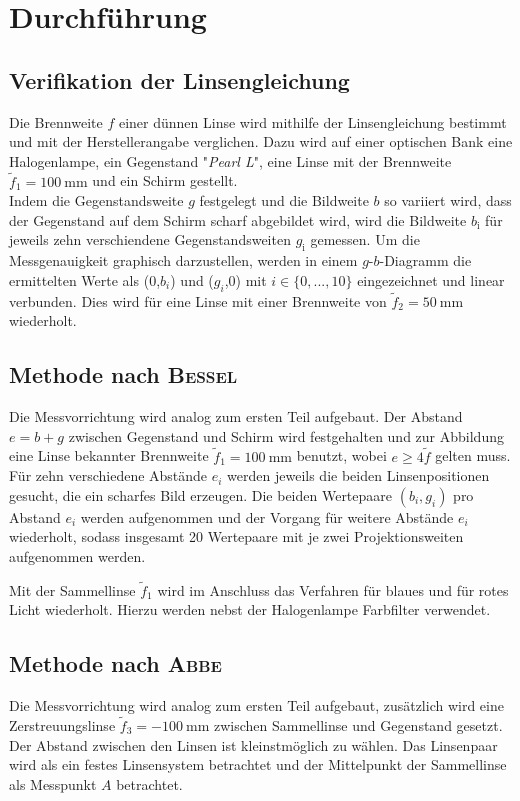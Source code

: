 \section{Durchführung}
\label{sec:Durchfuehrung}
\subsection{Verifikation der Linsengleichung}
\label{sec:Durchfuehrung1}
Die Brennweite $f$ einer dünnen Linse wird mithilfe der Linsengleichung bestimmt und mit der Herstellerangabe verglichen.
Dazu wird auf einer optischen Bank eine Halogenlampe, ein Gegenstand "\emph{Pearl L}",  eine Linse mit der Brennweite $\tilde{f}_1=\SI{100}{\milli\meter}$ und ein Schirm gestellt. \\
Indem die Gegenstandsweite $g$ festgelegt und die Bildweite $b$ so variiert wird, dass der Gegenstand auf dem Schirm scharf abgebildet wird, wird die Bildweite $b_\text{i}$ für jeweils zehn verschiendene Gegenstandsweiten $g_\text{i}$ gemessen.
Um die Messgenauigkeit graphisch darzustellen, werden in einem $g$-$b$-Diagramm die ermittelten Werte als ($0$,$b_i$) und ($g_i$,$0$) mit $i\in \{0,...,10\}$ eingezeichnet und linear verbunden.
Dies wird für eine Linse mit einer Brennweite von $\tilde{f}_2=\SI{50}{\milli\meter}$ wiederholt.


\subsection{Methode nach \texorpdfstring{\textsc{Bessel}}{Bessel}}
\label{sec:Durchfuehrung2}
Die Messvorrichtung wird analog zum ersten Teil aufgebaut.
Der Abstand \\$e=b+g$ zwischen Gegenstand und Schirm wird festgehalten und zur Abbildung eine Linse bekannter Brennweite $\tilde{f}_1=\SI{100}{\milli\meter}$ benutzt, wobei $e\ge4\tilde{f}$ gelten muss.
Für zehn verschiedene Abstände $e_i$ werden jeweils die beiden Linsenpositionen gesucht, die ein scharfes Bild erzeugen. 
Die beiden Wertepaare $(b_i,g_i)$ pro Abstand $e_i$ werden aufgenommen und der Vorgang für weitere Abstände $e_i$ wiederholt, sodass insgesamt 20 Wertepaare mit je zwei Projektionsweiten aufgenommen werden.

Mit der Sammellinse $\tilde{f}_1$ wird im Anschluss das Verfahren für blaues und für rotes Licht wiederholt. 
Hierzu werden nebst der Halogenlampe Farbfilter verwendet.

\subsection{Methode nach \texorpdfstring{\textsc{Abbe}}{Abbe}}
\label{sec:Durchfuehrung3}
Die Messvorrichtung wird analog zum ersten Teil aufgebaut, zusätzlich wird eine Zerstreuungslinse  $\tilde{f}_3=\SI{-100}{\milli\meter}$ zwischen Sammellinse und Gegenstand gesetzt.
Der Abstand zwischen den Linsen ist kleinstmöglich zu wählen.
Das Linsenpaar wird als ein festes Linsensystem betrachtet und der Mittelpunkt der Sammellinse als Messpunkt $A$ betrachtet.

